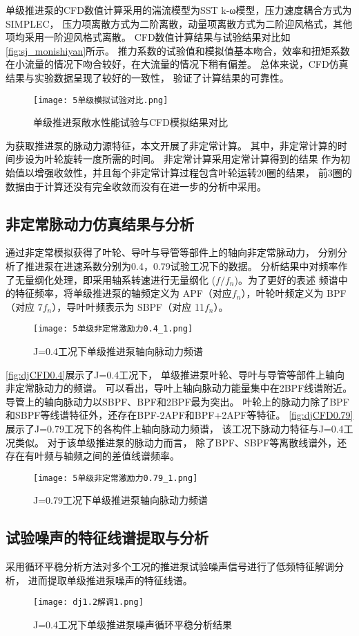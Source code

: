 单级推进泵的CFD数值计算采用的湍流模型为SST k-ω模型，压力速度耦合方式为SIMPLEC，
压力项离散方式为二阶离散，动量项离散方式为二阶迎风格式，其他项均采用一阶迎风格式离散\cite{rao2012,bai2020}。
CFD数值计算结果与试验结果对比如\autoref{fig:sj_monishiyan}所示。
推力系数的试验值和模拟值基本吻合，效率和扭矩系数在小流量的情况下吻合较好，在大流量的情况下稍有偏差。
总体来说，CFD仿真结果与实验数据呈现了较好的一致性，
验证了计算结果的可靠性。
\begin{figure}[htbp]
    \centering
    \texttt{[image: 5单级模拟试验对比.png]}
    \caption{\label{fig:sj_monishiyan}单级推进泵敞水性能试验与CFD模拟结果对比}
\end{figure}

为获取推进泵的脉动力源特征，本文开展了非定常计算。
其中，非定常计算的时间步设为叶轮旋转一度所需的时间。
非定常计算采用定常计算得到的结果
作为初始值以增强收敛性，并且每个非定常计算过程包含叶轮运转20圈的结果，
前3圈的数据由于计算还没有完全收敛而没有在进一步的分析中采用。
\subsection{非定常脉动力仿真结果与分析}
通过非定常模拟获得了叶轮、导叶与导管等部件上的轴向非定常脉动力，
分别分析了推进泵在进速系数分别为0.4，0.79试验工况下的数据。
分析结果中对频率作了无量纲化处理，即采用轴系转速进行无量纲化 ($f/f_n$)。为了更好的表述
频谱中的特征频率，将单级推进泵的轴频定义为 APF（对应$f_n$），叶轮叶频定义为 BPF
（对应 7$f_n$），导叶叶频表示为 SBPF（对应 11$f_n$）。
\begin{figure}[htbp]
    \centering
    \texttt{[image: 5单级非定常激励力0.4\_1.png]}
    \caption{\label{fig:djCFD0.4}J=0.4工况下单级推进泵轴向脉动力频谱}
\end{figure}

\autoref{fig:djCFD0.4}展示了J=0.4工况下，
单级推进泵叶轮、导叶与导管等部件上轴向非定常脉动力的频谱。
可以看出，导叶上轴向脉动力能量集中在2BPF线谱附近。
导管上的轴向脉动力以SBPF、BPF和2BPF最为突出。
叶轮上的脉动力除了BPF和SBPF等线谱特征外，还存在BPF-2APF和BPF+2APF等特征。
\autoref{fig:djCFD0.79}展示了J=0.79工况下的各构件上轴向脉动力频谱，
该工况下脉动力特征与J=0.4工况类似。
对于该单级推进泵的脉动力而言，
除了BPF、SBPF等离散线谱外，还存在有叶频与轴频之间的差值线谱频率。
\begin{figure}[htbp]
    \centering
    \texttt{[image: 5单级非定常激励力0.79\_1.png]}
    \caption{\label{fig:djCFD0.79}J=0.79工况下单级推进泵轴向脉动力频谱}
\end{figure}
\subsection{试验噪声的特征线谱提取与分析}
采用循环平稳分析方法对多个工况的推进泵试验噪声信号进行了低频特征解调分析，
进而提取单级推进泵噪声的特征线谱。
\begin{figure}[htbp]
    \centering
    \texttt{[image: dj1.2解调1.png]}
    \caption{\label{fig:djjietiao1.2}J=0.4工况下单级推进泵噪声循环平稳分析结果}
\end{figure}


